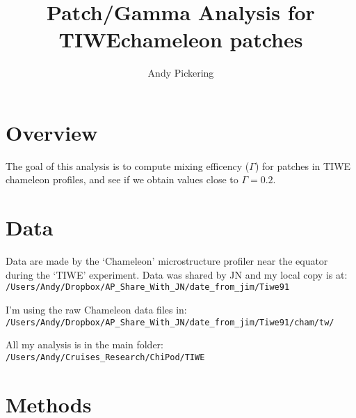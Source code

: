 \documentclass[11pt]{article}
\title{Patch/Gamma Analysis for TIWEchameleon patches}
\author{Andy Pickering}
\begin{document}
\maketitle

\tableofcontents
\newpage

\section{Overview}

The goal of this analysis is to compute mixing efficency ($\Gamma$) for patches in TIWE chameleon profiles, and see if we obtain values close to $\Gamma=0.2$.

\section{Data}

Data are made by the `Chameleon' microstructure profiler near the equator during the `TIWE' experiment. Data was shared by JN and my local copy is at: \newline \verb+/Users/Andy/Dropbox/AP_Share_With_JN/date_from_jim/Tiwe91+

\medskip

I'm using the raw Chameleon data files in: \newline
\verb+/Users/Andy/Dropbox/AP_Share_With_JN/date_from_jim/Tiwe91/cham/tw/+

\medskip

All my analysis is in the main folder: \newline  \verb+/Users/Andy/Cruises_Research/ChiPod/TIWE+


\section{Methods}
\end{document}

